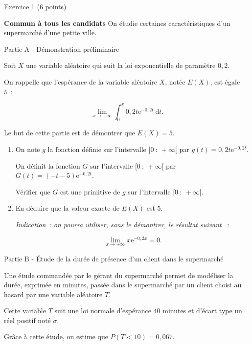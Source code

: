 
\begin{h2}Exercice 1 (6 points)\end{h2}
\textbf{Commun à  tous les candidats}
\medskip
On étudie certaines caractéristiques d'un supermarché d'une petite ville.
\bigskip
\begin{center}\begin{h3}Partie A - Démonstration préliminaire \end{h3}\end{center}
\medskip
Soit $X$ une variable aléatoire qui suit la loi exponentielle de paramètre $0,2$.
\par
On rappelle que l'espérance de la variable aléatoire $X$, notée $E(X)$, est égale à~:
\par
\[\displaystyle\lim_{x \to + \infty}\displaystyle\int_{0}^{x}  0,2t\text{e}^{-0,2t}\:\text{d}t.\]
\par
Le but de cette partie est de démontrer que $E(X) = 5$.
\medskip
\begin{enumerate}
     \item On note $g$ la fonction définie sur l'intervalle $[0~:~+\infty[$ par $g(t) = 0,2t\text{e}^{-0,2t}$.
     \par
     On définit la fonction $G$ sur l'intervalle $[0~:~+\infty[$ par $G(t) = (- t - 5)\text{e}^{-0,2t}$.
     \par
     Vérifier que $G$ est une primitive de $g$ sur l'intervalle $[0~:~+\infty[$.
     \item  En déduire que la valeur exacte de $E(X)$ est 5.
     \par
     \emph{Indication~: on pourra utiliser, sans le démontrer, le résultat suivant }~:
     \par
     \[\displaystyle\lim_{x \to + \infty} x \text{e}^{- 0,2x} = 0.\]
\end{enumerate}
\bigskip
\begin{center}\begin{h3}Partie B - Étude de la durée de présence d'un client dans le supermarché \end{h3}\end{center}
\medskip
Une étude commandée par le gérant du supermarché permet de modéliser la durée, exprimée en
minutes, passée dans le supermarché par un client choisi au hasard par une variable aléatoire $T$.
\par
Cette variable $T$ suit une loi normale d'espérance $40$ minutes et d'écart type un réel positif noté $\sigma$.
\par
Grâce à cette étude, on estime que $P(T < 10) = 0,067$.
